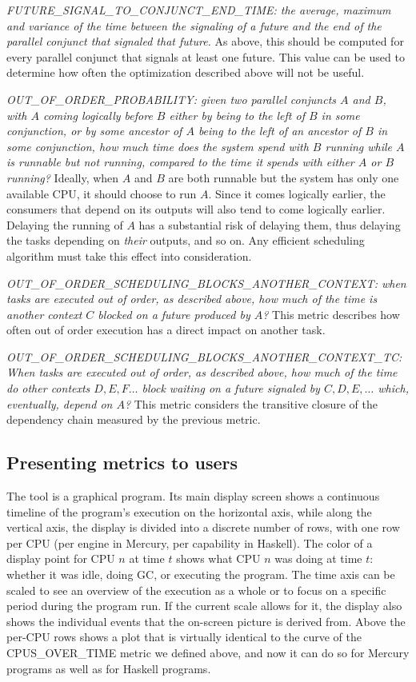 \emph{FUTURE\_SIGNAL\_TO\_CONJUNCT\_END\_TIME:
the average, maximum and variance of the time
between the signaling of a future
and the end of the parallel conjunct that signaled that future.}
As above, this should be computed for
every parallel conjunct that signals at least one future.
This value can be used to determine
how often the optimization described above will not be useful.

\emph{OUT\_OF\_ORDER\_PROBABILITY:
given two parallel conjuncts $A$ and $B$,
with $A$ coming logically before $B$
either by being to the left of $B$ in some conjunction,
or by some ancestor of $A$ being to the left of an ancestor of $B$
in some conjunction,
how much time does the system spend with $B$ running
while $A$ is runnable but not running,
compared to the time it spends with either $A$ or $B$ running?}
Ideally, when $A$ and $B$ are both runnable
but the system has only one available CPU,
it should choose to run $A$.
Since it comes logically earlier,
the consumers that depend on its outputs
will also tend to come logically earlier.
Delaying the running of $A$ has a substantial risk of delaying them,
thus delaying the tasks depending on \emph{their} outputs, and so on.
Any efficient scheduling algorithm
must take this effect into consideration.

\emph{OUT\_OF\_ORDER\_SCHEDULING\_BLOCKS\_ANOTHER\_CONTEXT:
when tasks are executed out of order, as described above,
how much of the time is another context $C$
blocked on a future produced by $A$?}
This metric describes how often
out of order execution has a direct impact on another task.

\emph{OUT\_OF\_ORDER\_SCHEDULING\_BLOCKS\_ANOTHER\_CONTEXT\_TC:
When tasks are executed out of order, as described above,
how much of the time do other contexts $D, E, F\ldots$ block
waiting on a future signaled by $C, D, E, \ldots$
which, eventually, depend on $A$?}
This metric considers the transitive closure of the dependency chain
measured by the previous metric.

\subsection{Presenting metrics to users}

The \tscope tool is a graphical program.
Its main display screen shows
a continuous timeline of the program's execution on the horizontal axis,
while along the vertical axis,
the display is divided into a discrete number of rows,
with one row per CPU (per engine in Mercury, per capability in Haskell).
The color of a display point for CPU $n$ at time $t$
shows what CPU $n$ was doing at time $t$:
whether it was idle, doing GC, or executing the program.
The time axis can be scaled to see an overview of the execution as a whole
or to focus on a specific period during the program run.
If the current scale allows for it,
the display also shows the individual events
that the on-screen picture is derived from.
Above the per-CPU rows \tscope shows a plot that is virtually identical
to the curve of the CPUS\_OVER\_TIME metric we defined above,
and now it can do so for Mercury programs as well as for Haskell programs.

